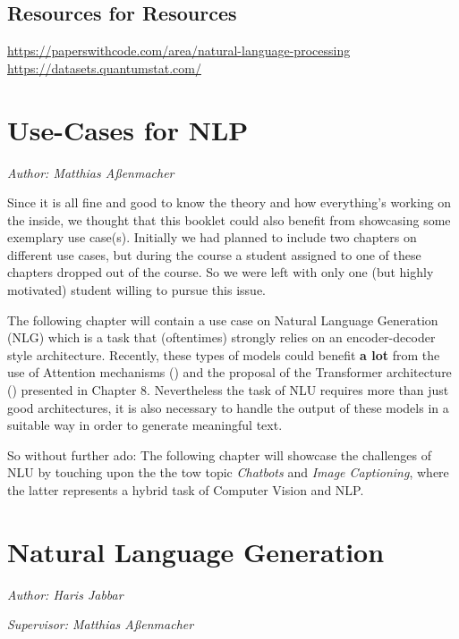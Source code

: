 \documentclass[]{krantz}
\begin{document}
\hypertarget{resources-for-resources}{%
\section{Resources for Resources}\label{resources-for-resources}}

\url{https://paperswithcode.com/area/natural-language-processing}
\url{https://datasets.quantumstat.com/}

\hypertarget{use-cases-for-nlp}{%
\chapter{Use-Cases for NLP}\label{use-cases-for-nlp}}

\emph{Author: Matthias Aßenmacher}

Since it is all fine and good to know the theory and how everything's working on the inside,
we thought that this booklet could also benefit from showcasing some exemplary use case(s).
Initially we had planned to include two chapters on different use cases, but during the course
a student assigned to one of these chapters dropped out of the course. So we were left with only
one (but highly motivated) student willing to pursue this issue.

The following chapter will contain a use case on Natural Language Generation (NLG) which is a task
that (oftentimes) strongly relies on an encoder-decoder style architecture. Recently, these types
of models could benefit \textbf{a lot} from the use of Attention mechanisms (\citet{bahdanau2014neural}) and the
proposal of the Transformer architecture (\citet{vaswani2017attention}) presented in Chapter 8.
Nevertheless the task of NLU requires more than just good architectures, it is also necessary to
handle the output of these models in a suitable way in order to generate meaningful text.

So without further ado: The following chapter will showcase the challenges of NLU by touching upon
the the tow topic \emph{Chatbots} and \emph{Image Captioning}, where the latter represents a hybrid task of
Computer Vision and NLP.

\hypertarget{natural-language-generation}{%
\chapter{Natural Language Generation}\label{natural-language-generation}}

\emph{Author: Haris Jabbar}

\emph{Supervisor: Matthias Aßenmacher}
\end{document}
